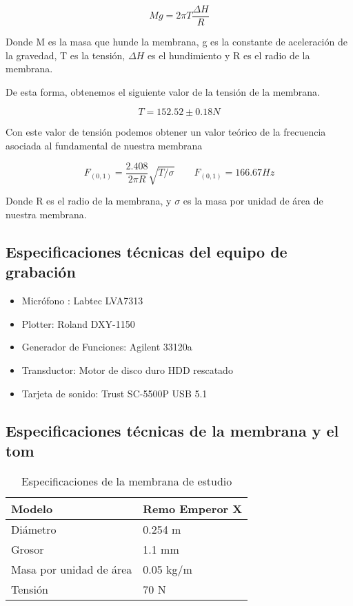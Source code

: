 \documentclass[journal, a4paper,onecolumn]{IEEEtran}
\begin{document}
\begin{equation}
    Mg=2\pi T\frac{\Delta H}{R}
    \label{tension}
\end{equation}

Donde M es la masa que hunde la membrana, g es la constante de aceleración de la gravedad, T es la tensión, $\Delta H$ es el hundimiento y R es el radio de la membrana.
\newline

De esta forma, obtenemos el siguiente valor de la tensión de la membrana.

\begin{equation}
    T= 152.52 \pm 0.18 N
\end{equation}

Con este valor de tensión podemos obtener un valor teórico de la frecuencia asociada al fundamental de nuestra membrana \cite{fisicamusical}

\begin{equation}
    F_{(0,1)}=\frac{2.408}{2\pi R}\sqrt{T/\sigma} \qquad F_{(0,1)}= 166.67 Hz
\end{equation}

Donde R es el radio de la membrana, y $\sigma$ es la masa por unidad de área de nuestra membrana. \newline

\subsection{Especificaciones técnicas del equipo de grabación}

\begin{itemize}
    \item Micrófono : Labtec LVA7313
    \item Plotter: Roland DXY-1150
    \item Generador de Funciones: Agilent 33120a
    \item Transductor: Motor de disco duro HDD rescatado
    \item Tarjeta de sonido: Trust SC-5500P USB 5.1
 \end{itemize}

\subsection{Especificaciones técnicas de la membrana y el tom}

\begin{table}[H]
\centering
\begin{tabular}{l|l}
Modelo                  & Remo Emperor X \\ \hline
Diámetro                & 0.254 m        \\ \hline
Grosor                  & 1.1 mm         \\ \hline
Masa por unidad de área & 0.05 kg/m       \\ \hline
Tensión                 & 70 N          
\end{tabular}
\caption{Especificaciones de la membrana de estudio}
\end{table}
\end{document}
